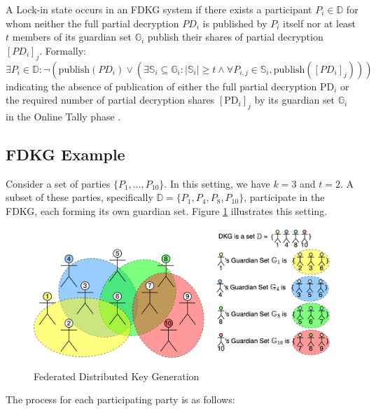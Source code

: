 \documentclass{article}
\begin{document}
\begin{definition}[Lock-in] \label{def:lock-in}
    A Lock-in state occurs in an FDKG system if there exists a participant $P_i \in \mathbb{D}$ for whom neither the full partial decryption $PD_i$ is published by $P_i$ itself nor at least $t$ members of its guardian set $\mathbb{G}_i$ publish their shares of partial decryption $[PD_i]_j$. Formally:
    \[
    \exists P_i \in \mathbb{D} : \neg \left( \text{publish}(PD_i) \lor \left( \exists \mathbb{S}_i \subseteq \mathbb{G}_i : |\mathbb{S}_i| \geq t \land \forall P_{i,j} \in \mathbb{S}_i, \text{publish}([PD_i]_j) \right) \right)
    \]
    indicating the absence of publication of either the full partial decryption $\textrm{PD}_i$ or the required number of partial decryption shares $[\textrm{PD}_i]_j$ by its guardian set $\mathbb{G}_i$ in the Online Tally phase .
\end{definition}


\subsection*{FDKG Example}

Consider a set of parties $\{P_1, \ldots, P_{10}\}$. In this setting, we have $k = 3$ and $t = 2$. A subset of these parties, specifically $\mathbb{D} = \{P_1, P_4, P_8, P_{10}\}$, participate in the FDKG, each forming its own guardian set. Figure \ref{fig:FDKG} illustrates this setting.


\begin{figure}
    \centering
    \includegraphics[width=\textwidth]{FDKG.png}
    \caption{Federated Distributed Key Generation}
    \label{fig:FDKG}
\end{figure}

The process for each participating party is as follows:
\end{document}
